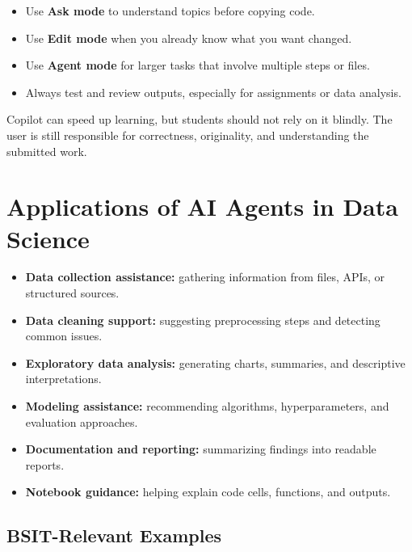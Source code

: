 \documentclass[11pt,a4paper]{article}
\begin{document}
\begin{itemize}[leftmargin=*]
  \item Use \textbf{Ask mode} to understand topics before copying code.
  \item Use \textbf{Edit mode} when you already know what you want changed.
  \item Use \textbf{Agent mode} for larger tasks that involve multiple steps or files.
  \item Always test and review outputs, especially for assignments or data analysis.
\end{itemize}

\begin{alertbox}
Copilot can speed up learning, but students should not rely on it blindly. The user is still responsible for correctness, originality, and understanding the submitted work.
\end{alertbox}

\section{Applications of AI Agents in Data Science}

\begin{itemize}[leftmargin=*]
  \item \textbf{Data collection assistance:} gathering information from files, APIs, or structured sources.
  \item \textbf{Data cleaning support:} suggesting preprocessing steps and detecting common issues.
  \item \textbf{Exploratory data analysis:} generating charts, summaries, and descriptive interpretations.
  \item \textbf{Modeling assistance:} recommending algorithms, hyperparameters, and evaluation approaches.
  \item \textbf{Documentation and reporting:} summarizing findings into readable reports.
  \item \textbf{Notebook guidance:} helping explain code cells, functions, and outputs.
\end{itemize}

\subsection{BSIT-Relevant Examples}
\end{document}

